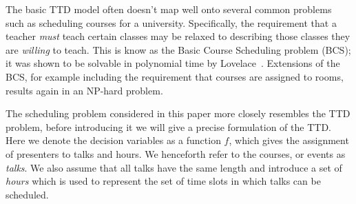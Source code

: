 \documentclass{svjour3}                     %
\begin{document}
The basic TTD model often doesn't map well onto several common problems such as scheduling courses for a university. 
Specifically, the requirement that a teacher \emph{must} teach certain classes may be relaxed to describing those classes they are \emph{willing} to teach. 
This is know as the Basic Course Scheduling problem (BCS); it was shown to be solvable in polynomial time by Lovelace~\cite{lovelace2010}. 
Extensions of the BCS, for example including the requirement that courses are assigned to rooms, results again in an NP-hard problem.

The scheduling problem considered in this paper more closely resembles the TTD problem, before introducing it we will give a precise formulation of the TTD.
Here we denote the decision variables as a function $f$, which gives the assignment of presenters to talks and hours.
We henceforth refer to the courses, or events as \emph{talks}.
We also assume that all talks have the same length and introduce a set of \emph{hours} which is used to represent the set of time slots in which talks can be scheduled.
\end{document}
